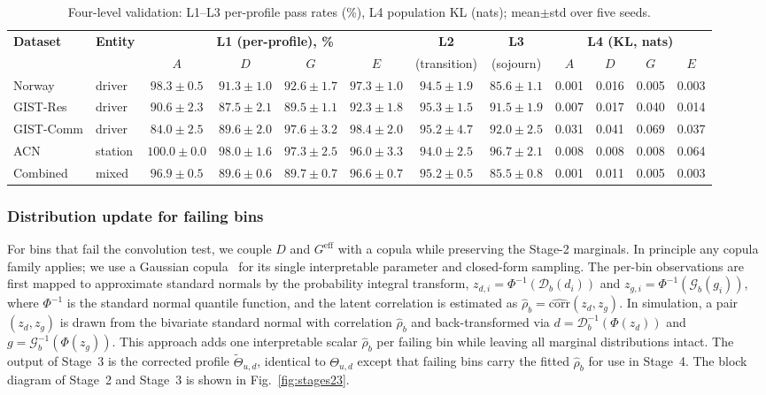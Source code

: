 \documentclass[journal]{IEEEtran}
\begin{document}
\begin{table}[t]
\centering
\caption{Four-level validation: L1--L3 per-profile pass rates (\%), L4 population KL (nats); mean$\pm$std over five seeds.}
\label{tab:validation}
\setlength{\tabcolsep}{4pt}
\footnotesize
\begin{tabular}{ll cccc cc cccc}
\toprule
\multirow{2}{*}{\textbf{Dataset}} & \multirow{2}{*}{\textbf{Entity}} & \multicolumn{4}{c}{\textbf{L1 (per-profile), \%}} & \textbf{L2} & \textbf{L3} & \multicolumn{4}{c}{\textbf{L4 (KL, nats)}} \\
\cmidrule(lr){3-6}\cmidrule(lr){9-12}
 & & $A$ & $D$ & $G$ & $E$ & {\footnotesize(transition)} & {\footnotesize(sojourn)} & $A$ & $D$ & $G$ & $E$ \\
\midrule
Norway & driver & $98.3\pm0.5$ & $91.3\pm1.0$ & $92.6\pm1.7$ & $97.3\pm1.0$ & $94.5\pm1.9$ & $85.6\pm1.1$ & 0.001 & 0.016 & 0.005 & 0.003 \\
GIST-Res & driver & $90.6\pm2.3$ & $87.5\pm2.1$ & $89.5\pm1.1$ & $92.3\pm1.8$ & $95.3\pm1.5$ & $91.5\pm1.9$ & 0.007 & 0.017 & 0.040 & 0.014 \\
GIST-Comm & driver & $84.0\pm2.5$ & $89.6\pm2.0$ & $97.6\pm3.2$ & $98.4\pm2.0$ & $95.2\pm4.7$ & $92.0\pm2.5$ & 0.031 & 0.041 & 0.069 & 0.037 \\
ACN & station & $100.0\pm0.0$ & $98.0\pm1.6$ & $97.3\pm2.5$ & $96.0\pm3.3$ & $94.0\pm2.5$ & $96.7\pm2.1$ & 0.008 & 0.008 & 0.008 & 0.064 \\
\midrule
Combined & mixed & $96.9\pm0.5$ & $89.6\pm0.6$ & $89.7\pm0.7$ & $96.6\pm0.7$ & $95.2\pm0.5$ & $85.5\pm0.8$ & 0.001 & 0.011 & 0.005 & 0.003 \\
\bottomrule
\end{tabular}
\end{table}

\subsubsection{Distribution update for failing bins}

For bins that fail the convolution test, we couple $D$ and $G^{\mathrm{eff}}$ with a copula while preserving the Stage-2 marginals. In principle any copula family applies; we use a Gaussian copula~\cite{nelsen2006introduction} for its single interpretable parameter and closed-form sampling. The per-bin observations are first mapped to approximate standard normals by the probability integral transform, $z_{d,i} = \Phi^{-1}(\mathcal{D}_b(d_i))$ and $z_{g,i} = \Phi^{-1}(\mathcal{G}_b(g_i))$, where $\Phi^{-1}$ is the standard normal quantile function, and the latent correlation is estimated as $\hat{\rho}_b = \widehat{\mathrm{corr}}(z_d, z_g)$. In simulation, a pair $(z_d, z_g)$ is drawn from the bivariate standard normal with correlation $\hat{\rho}_b$ and back-transformed via $d = \mathcal{D}_b^{-1}(\Phi(z_d))$ and $g = \mathcal{G}_b^{-1}(\Phi(z_g))$.
This approach adds one interpretable scalar $\hat{\rho}_b$ per failing bin while leaving all marginal distributions intact. The output of Stage~3 is the corrected profile $\tilde{\Theta}_{u,d}$, identical to $\Theta_{u,d}$ except that failing bins carry the fitted $\hat{\rho}_b$ for use in Stage~4. The block diagram of Stage~2 and Stage~3 is shown in Fig.~\ref{fig:stages23}.
\end{document}
